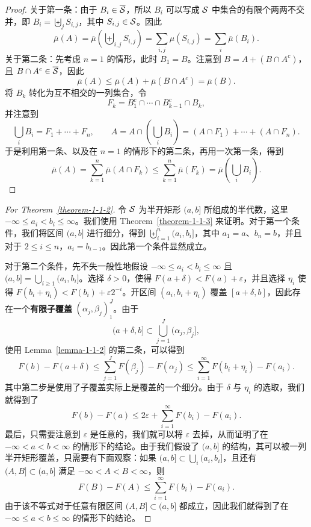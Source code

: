 \begin{proof}
    关于第一条：由于 $B_i \in \overline{\mathcal{S}}$，所以 $B_i$ 可以写成 $\mathcal{S}$ 中集合的有限个两两不交并，即 $B_i = \biguplus_j S_{i,j}$，其中 $S_{i,j} \in \mathcal{S}$。因此
    \[
        \overline{\mu}(A) = \overline{\mu}\!\left( \biguplus_{i,j} S_{i,j} \right)
        = \sum_{i,j} \mu(S_{i,j})
        = \sum_i \overline{\mu}(B_i).
    \]
    关于第二条：先考虑 $n=1$ 的情形，此时 $B_1 = B$。注意到 $B = A + (B \cap A^c)$，且 $B \cap A^c \in \overline{\mathcal{S}}$，因此
    \[
        \overline{\mu}(A) \le \overline{\mu}(A) + \overline{\mu}(B \cap A^c) = \overline{\mu}(B).
    \]
    将 $B_k$ 转化为互不相交的一列集合，令
    \[
        F_k = B_1^c \cap \cdots \cap B_{k-1}^c \cap B_k,
    \]
    并注意到
    \[
        \bigcup_i B_i = F_1 + \cdots + F_n,
        \qquad
        A = A \cap \left( \bigcup_i B_i \right) = (A \cap F_1) + \cdots + (A \cap F_n).
    \]
    于是利用第一条、以及在 $n=1$ 的情形下的第二条，再用一次第一条，得到
    \[
        \overline{\mu}(A)
        = \sum_{k=1}^n \overline{\mu}(A \cap F_k)
        \le \sum_{k=1}^n \overline{\mu}(F_k)
        = \overline{\mu}\!\left( \bigcup_i B_i \right).
    \]
\end{proof}

\begin{proof}[For Theorem~\ref{theorem-1-1-2}]
    令 $\mathcal{S}$ 为半开矩形 $(a,b]$ 所组成的半代数，这里 $-\infty \le a_i < b_i \le \infty$。我们使用 Theorem~\ref{theorem-1-1-3} 来证明。对于第一个条件，我们将区间 $(a,b]$ 进行细分，得到 $\biguplus_{i=1}^n (a_i,b_i]$，其中 $a_1 = a$、$b_n = b$，并且对于 $2 \le i \le n$，$a_i = b_{i-1}$。因此第一个条件显然成立。

    对于第二个条件，先不失一般性地假设 $-\infty \le a_i < b_i \le \infty$ 且 $(a,b] = \bigcup_{i \ge 1} (a_i,b_i]$。选择 $\delta > 0$，使得 $F(a+\delta) < F(a) + \varepsilon$，并且选择 $\eta_i$ 使得 $F(b_i+\eta_i) < F(b_i) + \varepsilon 2^{-i}$。开区间 $(a_i, b_i+\eta_i)$ 覆盖 $[a+\delta,b]$，因此存在一个{\normalfont\bfseries 有限子覆盖} $(\alpha_j,\beta_j)_{1}^{J}$。由于
    \[
        (a+\delta,b] \subset \bigcup_{j=1}^{J} (\alpha_j,\beta_j],
    \]
    使用 Lemma~\ref{lemma-1-1-2} 的第二条，可以得到
    \[
        F(b) - F(a+\delta)
        \le \sum_{j=1}^{J} F(\beta_j) - F(\alpha_j)
        \le \sum_{i=1}^{\infty} F(b_i+\eta_i) - F(a_i).
    \]
    其中第二步是使用了子覆盖实际上是覆盖的一个细分。由于 $\delta$ 与 $\eta_i$ 的选取，我们就得到了
    \[
        F(b) - F(a) \le 2\varepsilon + \sum_{i=1}^{\infty} F(b_i) - F(a_i).
    \]
    最后，只需要注意到 $\varepsilon$ 是任意的，我们就可以将 $\varepsilon$ 去掉，从而证明了在 $-\infty < a < b < \infty$ 的情形下的结论。由于我们假设了 $(a,b]$ 的结构，其可以被一列半开矩形覆盖，只需要有下面观察：如果 $(a,b] \subset \bigcup_i (a_i,b_i]$，且还有 $(A,B] \subset (a,b]$ 满足 $-\infty < A < B < \infty$，则
    \[
        F(B) - F(A) \le \sum_{i=1}^{\infty} F(b_i) - F(a_i).
    \]
    由于该不等式对于任意有限区间 $(A,B] \subset (a,b]$ 都成立，因此我们就得到了在 $-\infty \le a < b \le \infty$ 的情形下的结论。
\end{proof}


